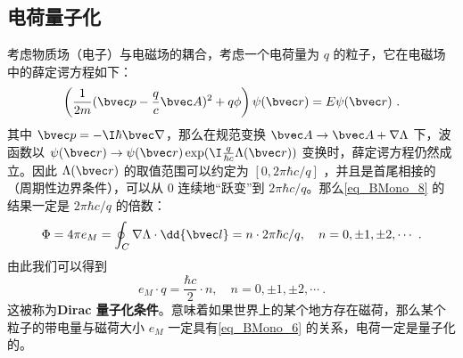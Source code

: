 \subsection{电荷量子化}
考虑物质场（电子）与电磁场的耦合，考虑一个电荷量为 $q$ 的粒子，它在电磁场中的薛定谔方程如下：
\begin{equation}
\left(\frac{1}{2m}(\bvec p-\frac{q}{c}\bvec A)^2 +q\phi\right)\psi(\bvec r) = E\psi(\bvec r)~.
\end{equation}
其中 $\bvec p=-\I\hbar\bvec \nabla$，那么在规范变换 $\bvec A\rightarrow \bvec A+\nabla \Lambda$ 下，波函数以 $\psi(\bvec r)\rightarrow \psi(\bvec r)\exp(\I\frac{q}{\hbar c}\Lambda(\bvec r))$ 变换时，薛定谔方程仍然成立。因此 $\Lambda(\bvec r)$ 的取值范围可以约定为 $[0,2\pi \hbar c/q]$ ，并且是首尾相接的（周期性边界条件），可以从 $0$ 连续地“跃变”到 $2\pi \hbar c/q$。那么\autoref{eq_BMono_8} 的结果一定是 $2\pi \hbar c/q$ 的倍数：
\begin{equation}
\Phi = 4\pi e_M=\oint_C \nabla\Lambda\cdot \dd{\bvec l} = n\cdot 2\pi \hbar c/q,\quad n=0,\pm 1,\pm 2,\cdots ~.
\end{equation}
由此我们可以得到
\begin{equation}
e_M \cdot q= \frac{\hbar c}{2}\cdot n,\quad n=0,\pm 1,\pm 2,\cdots~.
\end{equation}
这被称为\textbf{Dirac 量子化条件}。意味着如果世界上的某个地方存在磁荷，那么某个粒子的带电量与磁荷大小 $e_M$ 一定具有\autoref{eq_BMono_6} 的关系，电荷一定是量子化的。